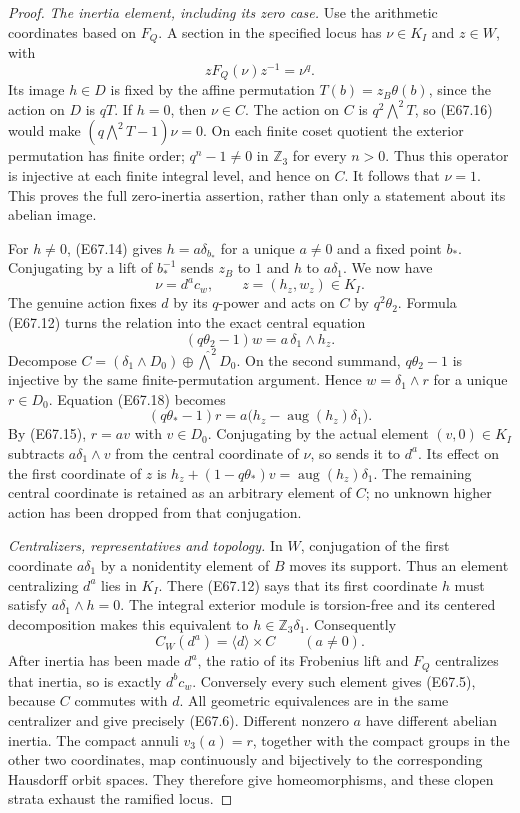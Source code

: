 \begin{proof}
\emph{The inertia element, including its zero case.}
Use the arithmetic coordinates based on $F_Q$. A section
in the specified locus has $\nu\in K_I$ and
$z\in W$, with
\[
                     zF_Q(\nu)z^{-1}=\nu^q.
 \tag{E67.16}
\]
Its image $h\in D$ is fixed by the affine permutation
$T(b)=z_B\theta(b)$, since the action on $D$ is $qT$.
If $h=0$, then $\nu\in C$. The action on $C$ is
$q^2\bigwedge^2T$, so (E67.16) would make
$(q\bigwedge^2T-1)\nu=0$. On each finite coset
quotient the exterior permutation has finite order;
$q^n-1\ne0$ in $\mathbb Z_3$ for every $n>0$.
Thus this operator is injective at each finite integral
level, and hence on $C$. It follows that $\nu=1$.
This proves the full zero-inertia assertion, rather than
only a statement about its abelian image.

For $h\ne0$, (E67.14) gives $h=a\delta_{b_*}$ for
a unique $a\ne0$ and a fixed point $b_*$. Conjugating
by a lift of $b_*^{-1}$ sends $z_B$ to $1$ and $h$
to $a\delta_1$. We now have
\[
                \nu=d^a c_w,\qquad z=(h_z,w_z)\in K_I.
 \tag{E67.17}
\]
The genuine action fixes $d$ by its $q$-power and acts
on $C$ by $q^2\theta_2$. Formula (E67.12) turns the
relation into the exact central equation
\[
          (q\theta_2-1)w=a\,\delta_1\wedge h_z.
 \tag{E67.18}
\]
Decompose $C=(\delta_1\wedge D_0)\oplus
\widehat{\bigwedge}^2D_0$. On the second summand,
$q\theta_2-1$ is injective by the same finite-permutation
argument. Hence $w=\delta_1\wedge r$ for a unique
$r\in D_0$. Equation (E67.18) becomes
\[
       (q\theta_*-1)r
          =a\bigl(h_z-\operatorname{aug}(h_z)\delta_1\bigr).
 \tag{E67.19}
\]
By (E67.15), $r=av$ with $v\in D_0$.
Conjugating by the actual element $(v,0)\in K_I$
subtracts $a\delta_1\wedge v$ from the central
coordinate of $\nu$, so sends it to $d^a$.
Its effect on the first coordinate of $z$ is
$h_z+(1-q\theta_*)v
=\operatorname{aug}(h_z)\delta_1$.
The remaining central coordinate is retained as an
arbitrary element of $C$; no unknown higher action has
been dropped from that conjugation.

\emph{Centralizers, representatives and topology.}
In $W$, conjugation of the first coordinate $a\delta_1$
by a nonidentity element of $B$ moves its support.
Thus an element centralizing $d^a$ lies in $K_I$.
There (E67.12) says that its first coordinate $h$ must
satisfy $a\delta_1\wedge h=0$.
The integral exterior module is torsion-free and its
centered decomposition makes this equivalent to
$h\in\mathbb Z_3\delta_1$. Consequently
\[
                   C_W(d^a)=\langle d\rangle\times C
                     \qquad(a\ne0).
 \tag{E67.20}
\]
After inertia has been made $d^a$, the ratio of its
Frobenius lift and $F_Q$ centralizes that inertia, so
is exactly $d^bc_w$. Conversely every such element
gives (E67.5), because $C$ commutes with $d$.
All geometric equivalences are in the same centralizer
and give precisely (E67.6). Different nonzero $a$ have
different abelian inertia. The compact annuli
$v_3(a)=r$, together with the compact groups in the
other two coordinates, map continuously and bijectively
to the corresponding Hausdorff orbit spaces. They
therefore give homeomorphisms, and these clopen strata
exhaust the ramified locus.


\end{proof}
